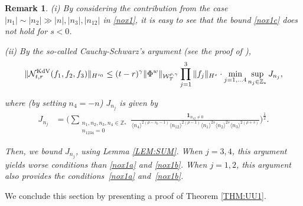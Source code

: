 \documentclass[letterpaper, 11pt,  reqno]{amsart}
\newtheorem{remark}[theorem]{Remark}
\newcommand{\1}{\hspace{0.5mm}\text{I}\hspace{0.5mm}}
\newcommand{\noi}{\noindent}
\newcommand{\Z}{\mathbb{Z}}
\newcommand{\g}{\gamma}
\newcommand{\jb}[1]
{\langle #1 \rangle}
\newcommand{\ind}{\mathbf 1}
\newcommand{\NN}{\mathcal{N}}
\newcommand{\W}{\mathcal{W}}
\newcommand{\KDV}{\text{\rm KdV} }
\numberwithin{equation}{section}
\numberwithin{theorem}{section}
\begin{document}
\begin{remark}\label{REM:non1}\rm
(i) By considering the contribution from 
the case $|n_1|\sim |n_2|\gg |n|, |n_3|, |n_{12}|$
in \eqref{nox1}, 
it is easy to see that the 
bound \eqref{nox1c} does not hold for $s < 0$.


\smallskip

\noi
(ii) 
By  the so-called Cauchy-Schwarz's argument
(see the proof of \cite[Proposition 4.1]{CGLLO1}), 
\begin{align*}
 \|\NN^\KDV_{t, r}(f_1, f_2, f_3)\|_{H^{s_0}}
 \le
(t-r)^\g  \|\Phi^w\|_{  \W^{\rho,\g}_T} 
\prod_{j = 1}^3\|f_j\|_{H^s}
\cdot \min_{j = 1, \dots 4}\sup_{n_j \in \Z_*} J_{n_j}, 
\end{align*}


\noi
where (by setting $n_4 = -n$) $J_{n_j}$ is given by 
\begin{align*}
J_{n_j} 
& = \bigg(
\sum_{\substack{n_1, n_2, n_3, n_4 \in \Z_*\\ n_{1234}= 0}}
\frac{\ind_{n_{12}\ne 0}}{\jb{n_4}^{2(\rho-s_0 - 1)}
\jb{n_{12}}^{2(\rho-1)}
\jb{n_1}^{2s}\jb{n_2}^{2s}\jb{n_3}^{2(\rho+s)}} 
 \bigg)^\frac{1}{2}.
\end{align*}


\noi
Then, we  bound $J_{n_j}$, using Lemma \ref{LEM:SUM}.
When $j = 3, 4$, 
this argument yields worse conditions than \eqref{nox1a} and \eqref{nox1b}.
When $j = 1, 2$, 
this argument also provides the conditions~\eqref{nox1a} and~\eqref{nox1b}.




\end{remark}












We conclude this section by  presenting a proof of Theorem \ref{THM:UU1}.
\end{document}
